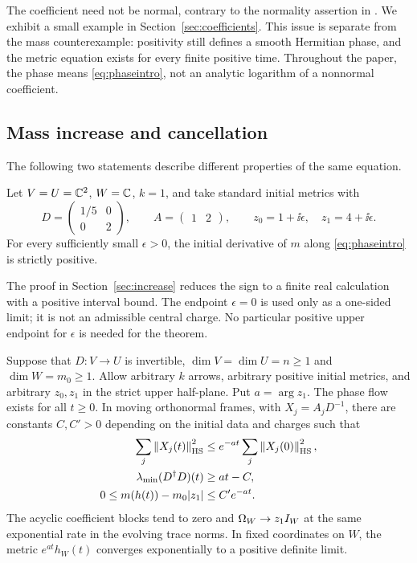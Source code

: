 The coefficient need not be normal, contrary to the normality assertion
in \cite[Lemma~5.16]{hkkp26}. We exhibit a small example in
Section~\ref{sec:coefficients}. This issue is separate from the mass
counterexample: positivity still defines a smooth Hermitian phase, and
the metric equation exists for every finite positive time.
Throughout the paper, the phase means \eqref{eq:phaseintro}, not an
analytic logarithm of a nonnormal coefficient.

\subsection{Mass increase and cancellation}
The following two statements describe different properties of the same
equation.

\begin{theorem}\label{thm:introincrease}
Let $V=U=\mathbb C^2$, $W=\mathbb C$, $k=1$, and take standard initial metrics with
\[
 D=\begin{pmatrix}1/5&0\\0&2\end{pmatrix},\qquad
 A=\begin{pmatrix}1&2\end{pmatrix},\qquad
 z_0=1+\ii\epsilon,\quad z_1=4+\ii\epsilon .
\]
For every sufficiently small $\epsilon>0$, the initial derivative of
$m$ along \eqref{eq:phaseintro} is strictly positive.
\end{theorem}

The proof in Section~\ref{sec:increase} reduces the sign to a finite
real calculation with a positive interval bound. The endpoint
$\epsilon=0$ is used only as a one-sided limit; it is not an admissible
central charge. No particular positive upper endpoint for $\epsilon$
is needed for the theorem.

\begin{theorem}\label{thm:introcancellation}
Suppose that $D:V\to U$ is invertible, $\dim V=\dim U=n\geq1$ and
$\dim W=m_0\geq1$. Allow arbitrary $k$ arrows, arbitrary positive initial
metrics, and arbitrary $z_0,z_1$ in the strict upper half-plane.
Put $a=\arg z_1$. The phase flow exists for all $t\geq0$. In moving
orthonormal frames, with $X_j=A_jD^{-1}$, there are constants $C,C'>0$
depending on the initial data and charges such that
\begin{align}
 \sum_j\left\lVert X_j(t)\right\rVert_{\mathrm{HS}}^2
 &\leq e^{-at}\sum_j\left\lVert X_j(0)\right\rVert_{\mathrm{HS}}^2,\label{eq:introX}\\
 \lambda_{\min}(D^\dagger D)(t)&\geq at-C,\label{eq:introlambda}\\
 0\leq m(h(t))-m_0|z_1|&\leq C'e^{-at}.\label{eq:intromass}
\end{align}
The acyclic coefficient blocks tend to zero and
$\Omega_W\to z_1I_W$ at the same exponential rate in the evolving
trace norms. In fixed coordinates on $W$, the metric
$e^{at}h_W(t)$ converges exponentially to a positive definite limit.
\end{theorem}

